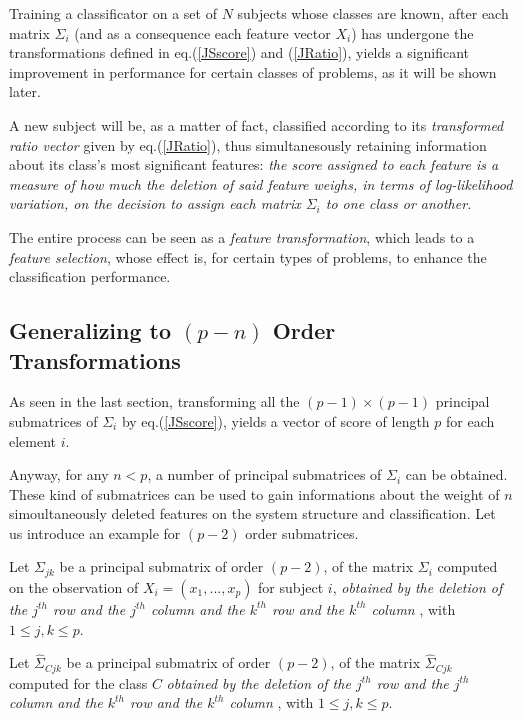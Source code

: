 \documentclass[12pt,openright,twoside,a4paper]{book}
\begin{document}
Training a classificator on a set of $N$ subjects whose classes are known, after each matrix $\Sigma_i$ (and as a consequence each feature vector $X_i$) has undergone the transformations defined in eq.(\ref{JSscore}) and (\ref{JRatio}), yields a significant improvement in performance for certain classes of problems, as it will be shown later.

A new subject will be, as a matter of fact, classified according to its \textit{transformed ratio vector} given by eq.(\ref{JRatio}), thus simultanesously retaining information about its class's most significant features: \textit{the score assigned to each feature is a measure of how much the deletion of said feature weighs, in terms of log-likelihood variation, on the decision to assign each matrix $\Sigma_i$ to one class or another.}
\vspace{5mm}

The entire process can be seen as a \textit{feature transformation}, which leads to a \textit{feature selection}, whose effect is, for certain types of problems, to enhance the classification performance.

\subsection{Generalizing to $(p-n)$ Order Transformations}
As seen in the last section, transforming all the $(p-1) \times (p-1)$ principal submatrices of $\Sigma_i$ by eq.(\ref{JSscore}), yields a vector of score of length $p$ for each element $i$.

Anyway, for any $n<p$, a number of principal submatrices of $\Sigma_i$ can be obtained.
These kind of submatrices can be used to gain informations about the weight of $n$ simoultaneously deleted features on the system structure and classification.
Let us introduce an example for $(p-2)$ order submatrices.

Let $\Sigma_{jk}$ be a principal submatrix of order $(p-2)$, of the matrix $\Sigma_i$ computed on the observation of $X_i=(x_1,...,x_p)$ for subject $i$, \textit{obtained by the deletion of the $j^{th}$ row and the $j^{th}$ column and the $k^{th}$ row and the $k^{th}$ column }, with $ 1\leq j,k\leq p$.
\vspace{5mm}

Let  $\hat{\Sigma}_{Cjk}$  be a principal submatrix of order $(p-2)$, of the matrix $\hat{\Sigma}_{Cjk}$ computed for the class $C$ \textit{obtained by the deletion of the $j^{th}$ row and the $j^{th}$ column and the $k^{th}$ row and the $k^{th}$ column }, with $ 1\leq j,k\leq p$.
\vspace{5mm}
\end{document}
